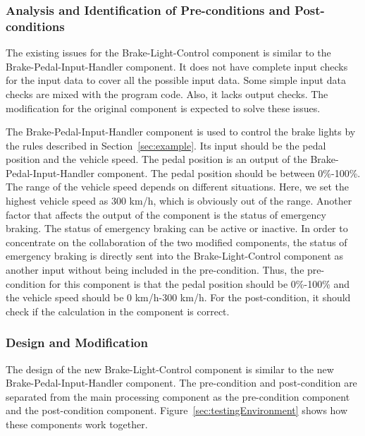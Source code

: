 \subsubsection{Analysis and Identification of Pre-conditions and Post-conditions }

The existing issues for the Brake-Light-Control component is similar to the Brake-Pedal-Input-Handler component. It does not have complete input checks for the input data to cover all the possible input data. Some simple input data checks are mixed with the program code. Also, it lacks output checks. The modification for the original component is expected to solve these issues.

The Brake-Pedal-Input-Handler component is used to control the brake lights by the rules described in Section~\ref{sec:example}. Its input should be the pedal position and the vehicle speed. The pedal position is an output of the Brake-Pedal-Input-Handler component. The pedal position should be between 0\%-100\%. The range of the vehicle speed depends on different situations. Here, we set the highest vehicle speed as 300 km/h, which is obviously out of the range. Another factor that affects the output of the component is the status of emergency braking. The status of emergency braking can be active or inactive. In order to concentrate on the collaboration of the two modified components, the status of emergency braking is directly sent into the Brake-Light-Control component as another input without being included in the pre-condition. Thus, the pre-condition for this component is that the pedal position should be 0\%-100\% and the vehicle speed should be 0 km/h-300 km/h. For the post-condition, it should check if the calculation in the component is correct.

\subsubsection{Design and Modification}
 The design of the new Brake-Light-Control component is similar to the new Brake-Pedal-Input-Handler component. The pre-condition and post-condition are separated from the main processing component as the pre-condition component and the post-condition component. Figure~\ref{sec:testingEnvironment} shows how these components work together.

